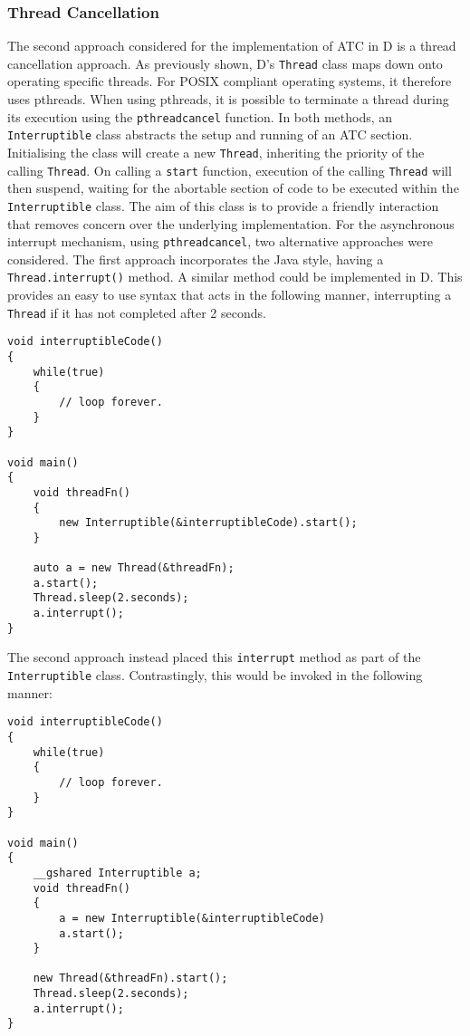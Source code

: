 \subsubsection*{Thread Cancellation}
The second approach considered for the implementation of ATC in D is a thread 
cancellation approach. As previously shown, D's \texttt{Thread} class maps down onto 
operating specific threads. For POSIX compliant operating systems, it therefore 
uses pthreads. When using pthreads, it is possible to terminate a thread during 
its execution using the \texttt{pthread\textunderscore{}cancel} function. 
In both methods, an \texttt{Interruptible} class abstracts the setup and running of an 
ATC section. 
Initialising the class will create a new \texttt{Thread}, 
inheriting the priority of the calling \texttt{Thread}. 
On calling a \texttt{start} function, execution of the calling 
\texttt{Thread} will then suspend, waiting for the abortable section 
of code to be executed within the \texttt{Interruptible} class.
The aim of this class is to provide a friendly interaction 
that removes concern over the underlying implementation. 
For the asynchronous interrupt mechanism, using
\texttt{pthread\textunderscore{}cancel},
two alternative approaches were considered.
The first approach incorporates the Java style, having a 
\texttt{Thread.interrupt()} method. A similar method could be implemented in D. 
This provides an easy to use syntax that acts in the following manner, 
interrupting a \texttt{Thread} if it has not completed after 2 seconds.
\begin{lstlisting}[basicstyle=\small]
void interruptibleCode()
{
    while(true)
    {
        // loop forever.
    }
}

void main()
{
    void threadFn()
    {
        new Interruptible(&interruptibleCode).start(); 
    }

    auto a = new Thread(&threadFn); 
    a.start(); 
    Thread.sleep(2.seconds); 
    a.interrupt();
}
\end{lstlisting}
The second approach instead placed this \texttt{interrupt} method as part of the 
\texttt{Interruptible} class. Contrastingly, this would be invoked in the following
manner: 
\begin{lstlisting}[basicstyle=\small]
void interruptibleCode()
{
    while(true)
    {
        // loop forever.
    }
}

void main()
{
    __gshared Interruptible a; 
    void threadFn()
    {
        a = new Interruptible(&interruptibleCode)
        a.start(); 
    }

    new Thread(&threadFn).start(); 
    Thread.sleep(2.seconds); 
    a.interrupt();
}
\end{lstlisting}
